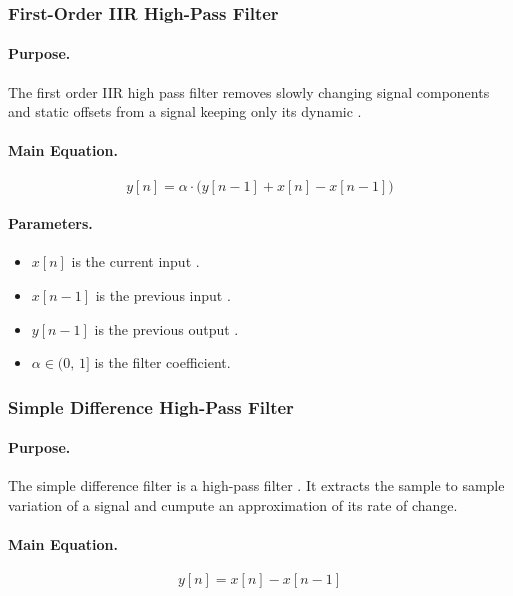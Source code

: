 \subsubsection{First-Order IIR High-Pass Filter}

\paragraph{Purpose.}
The first order IIR high pass filter removes slowly changing signal components and static
offsets from a signal keeping only its dynamic .

\paragraph{Main Equation.}
\begin{equation}
    y[n] = \alpha \cdot \bigl(y[n-1] + x[n] - x[n-1]\bigr)
    \label{eq:hp_iir}
\end{equation}

\paragraph{Parameters.}
\begin{itemize}
\item  $x[n]$ is the current input .
\item  $x[n-1]$ is the previous input .
\item  $y[n-1]$ is the previous output . 
\item  $\alpha \in (0,\,1]$ is the filter coefficient.
\end{itemize}
\subsubsection{Simple Difference High-Pass Filter}

\paragraph{Purpose.}
The simple difference filter is a high-pass filter .
 It extracts the sample to sample variation of a signal and cumpute an approximation of its rate of change.

\paragraph{Main Equation.}
\begin{equation}
    y[n] = x[n] - x[n-1]
    \label{eq:difference}
\end{equation}

